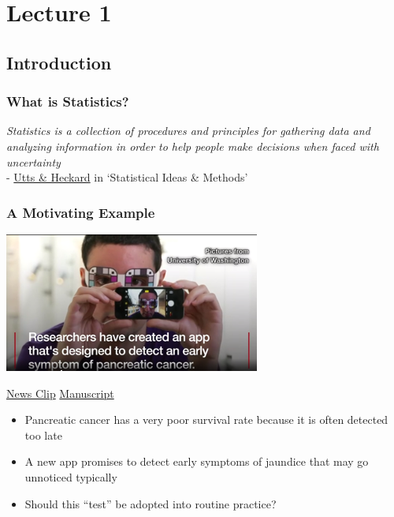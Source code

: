 \documentclass[
]{book}
\providecommand{\tightlist}{%
  \setlength{\itemsep}{0pt}\setlength{\parskip}{0pt}}
\begin{document}
\hypertarget{lecture-1}{%
\chapter{Lecture 1}\label{lecture-1}}

\hypertarget{introduction}{%
\section{Introduction}\label{introduction}}

\hypertarget{what-is-statistics}{%
\subsection{What is Statistics?}\label{what-is-statistics}}

\emph{Statistics is a collection of procedures and principles for gathering data and analyzing information in order to help people make decisions when faced with uncertainty}\\
- \href{https://www.amazon.ca/Statistical-Methods-Internet-Companion-Statistics/dp/0495122505}{Utts \& Heckard} in `Statistical Ideas \& Methods'

\hypertarget{a-motivating-example}{%
\subsection{A Motivating Example}\label{a-motivating-example}}

\includegraphics[width=0.5\linewidth]{./1_9}

\href{http://www.bbc.com/news/av/technology-41114587/selfie-app-spots-early-signs-of-pancreatic-cancer}{News Clip} \href{https://ubicomplab.cs.washington.edu/pdfs/biliscreen.pdf}{Manuscript}

\begin{itemize}
\tightlist
\item
  Pancreatic cancer has a very poor survival rate because it is often detected too late
\item
  A new app promises to detect early symptoms of jaundice that may go unnoticed typically
\item
  Should this ``test'' be adopted into routine practice?
\end{itemize}
\end{document}
